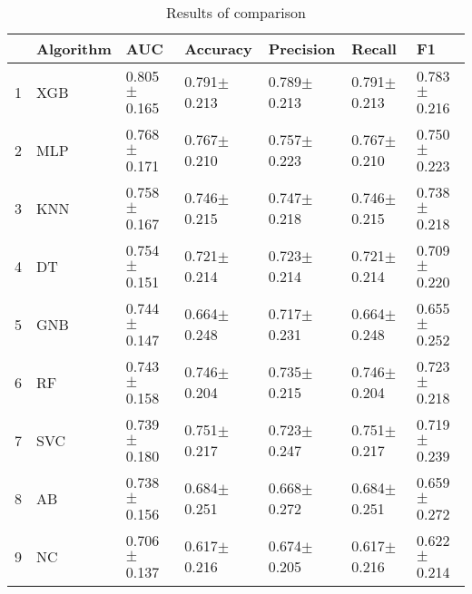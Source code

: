 \begin{table}
\footnotesize
\caption{Results of comparison}
\label{tab:comparison}
\begin{tabular}{lllllll}
\hline
 & Algorithm & AUC & Accuracy & Precision & Recall & F1 \\
\hline
1 & XGB & 0.805$\pm$0.165 & 0.791$\pm$0.213 & 0.789$\pm$0.213 & 0.791$\pm$0.213 & 0.783$\pm$0.216 \\
2 & MLP & 0.768$\pm$0.171 & 0.767$\pm$0.210 & 0.757$\pm$0.223 & 0.767$\pm$0.210 & 0.750$\pm$0.223 \\
3 & KNN & 0.758$\pm$0.167 & 0.746$\pm$0.215 & 0.747$\pm$0.218 & 0.746$\pm$0.215 & 0.738$\pm$0.218 \\
4 & DT & 0.754$\pm$0.151 & 0.721$\pm$0.214 & 0.723$\pm$0.214 & 0.721$\pm$0.214 & 0.709$\pm$0.220 \\
5 & GNB & 0.744$\pm$0.147 & 0.664$\pm$0.248 & 0.717$\pm$0.231 & 0.664$\pm$0.248 & 0.655$\pm$0.252 \\
6 & RF & 0.743$\pm$0.158 & 0.746$\pm$0.204 & 0.735$\pm$0.215 & 0.746$\pm$0.204 & 0.723$\pm$0.218 \\
7 & SVC & 0.739$\pm$0.180 & 0.751$\pm$0.217 & 0.723$\pm$0.247 & 0.751$\pm$0.217 & 0.719$\pm$0.239 \\
8 & AB & 0.738$\pm$0.156 & 0.684$\pm$0.251 & 0.668$\pm$0.272 & 0.684$\pm$0.251 & 0.659$\pm$0.272 \\
9 & NC & 0.706$\pm$0.137 & 0.617$\pm$0.216 & 0.674$\pm$0.205 & 0.617$\pm$0.216 & 0.622$\pm$0.214 \\
\hline
\end{tabular}
\end{table}
